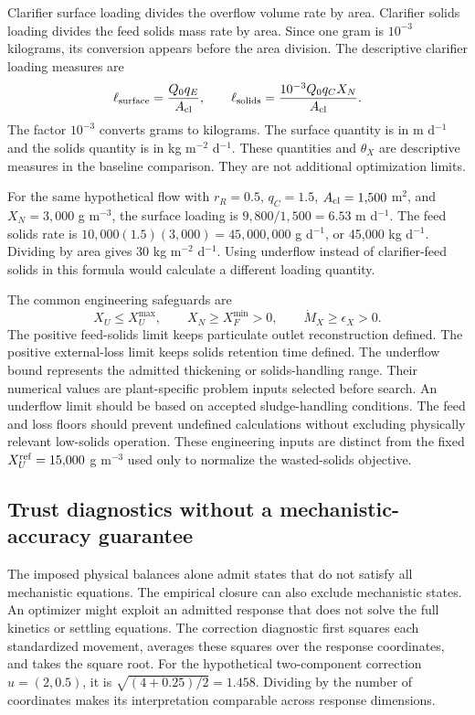 Clarifier surface loading divides the overflow volume rate by area. Clarifier solids loading divides the feed solids mass rate by area. Since one gram is $10^{-3}$ kilograms, its conversion appears before the area division. The descriptive clarifier loading measures are
\begin{equation}
\ell_{\rm surface}=\frac{Q_0q_E}{A_{\rm cl}},\qquad
\ell_{\rm solids}=\frac{10^{-3}Q_0q_CX_N}{A_{\rm cl}}.
\label{eq:plant_loading_measures}
\end{equation}
The factor $10^{-3}$ converts grams to kilograms. The surface quantity is in m d$^{-1}$ and the solids quantity is in kg m$^{-2}$ d$^{-1}$. These quantities and $\theta_X$ are descriptive measures in the baseline comparison. They are not additional optimization limits.

For the same hypothetical flow with $r_R=0.5$, $q_C=1.5$, $A_{\rm cl}=1{,}500$ m$^2$, and $X_N=3{,}000$ g m$^{-3}$, the surface loading is $9{,}800/1{,}500=6.53$ m d$^{-1}$. The feed solids rate is $10{,}000(1.5)(3{,}000)=45{,}000{,}000$ g d$^{-1}$, or 45{,}000 kg d$^{-1}$. Dividing by area gives 30 kg m$^{-2}$ d$^{-1}$. Using underflow instead of clarifier-feed solids in this formula would calculate a different loading quantity.

The common engineering safeguards are
\begin{equation}
X_U\le X_U^{\max},\qquad X_N\ge X_F^{\min}>0,\qquad
\dot M_X\ge\epsilon_X>0.
\label{eq:plant_engineering_safeguards}
\end{equation}
The positive feed-solids limit keeps particulate outlet reconstruction defined. The positive external-loss limit keeps solids retention time defined. The underflow bound represents the admitted thickening or solids-handling range. Their numerical values are plant-specific problem inputs selected before search. An underflow limit should be based on accepted sludge-handling conditions. The feed and loss floors should prevent undefined calculations without excluding physically relevant low-solids operation. These engineering inputs are distinct from the fixed $X_U^{\rm ref}=15{,}000$ g m$^{-3}$ used only to normalize the wasted-solids objective.

\subsection{Trust diagnostics without a mechanistic-accuracy guarantee}

The imposed physical balances alone admit states that do not satisfy all mechanistic equations. The empirical closure can also exclude mechanistic states. An optimizer might exploit an admitted response that does not solve the full kinetics or settling equations. The correction diagnostic first squares each standardized movement, averages these squares over the response coordinates, and takes the square root. For the hypothetical two-component correction $u=(2,0.5)$, it is $\sqrt{(4+0.25)/2}=1.458$. Dividing by the number of coordinates makes its interpretation comparable across response dimensions.

